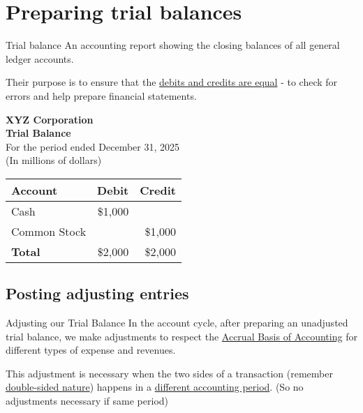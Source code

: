 \section{Preparing trial balances}
\label{sec:trial}

\begin{definition}
    {Trial balance}
    An accounting report showing the closing balances of all general ledger accounts.

    Their purpose is to ensure that the \underline{debits and credits are equal} - to check for errors and help prepare financial statements.
\end{definition}

\small
\begin{tcolorbox}[colframe=black,colback=white,title=Example Trial Balance]
    \begin{center}
        \textbf{XYZ Corporation}\\
        \textbf{Trial Balance}\\
        For the period ended December 31, 2025\\
        (In millions of dollars)
    \end{center}
    \begin{tabular}{lrr}
        \textbf{Account} & \textbf{Debit} & \textbf{Credit} \\
        \hline
        Cash             & \$1,000        &                 \\
        Common Stock     &                & \$1,000         \\
        \hline
        \textbf{Total}   & \$2,000        & \$2,000         \\
    \end{tabular}
\end{tcolorbox}
\normalsize

\subsection{Posting adjusting entries}
\label{subsec:post_adjust}

\begin{theorem}
    {Adjusting our Trial Balance}
    In the account cycle, after preparing an unadjusted trial balance, we make adjustments to respect the \hyperref[thm:accrual_basis]{Accrual Basis of Accounting} for different types of expense and revenues.

    This adjustment is necessary when the two sides of a transaction (remember \hyperref[thm:debit_credit]{double-sided nature}) happens in a \underline{different accounting period}. (So no adjustments necessary if same period)
\end{theorem}

